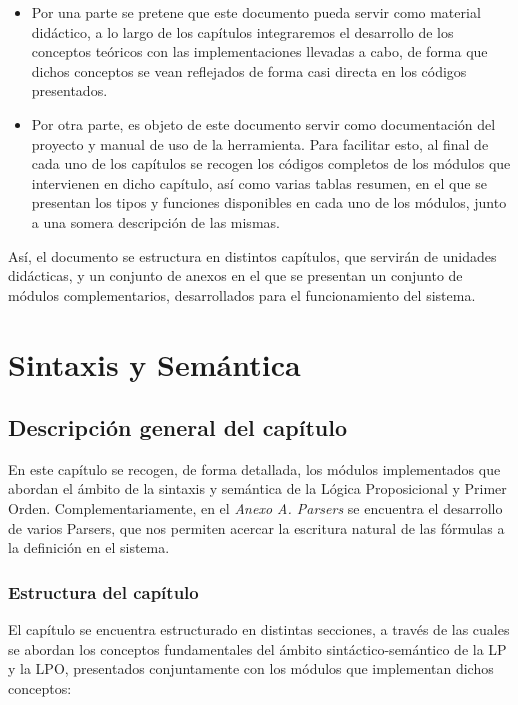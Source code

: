 \documentclass[a4paper]{report}
\begin{document}
\begin{itemize}
\item Por una parte se pretene que este documento pueda servir como material didáctico, a lo largo de los capítulos integraremos el desarrollo de los conceptos teóricos con las implementaciones llevadas a cabo, de forma que dichos conceptos se vean reflejados de forma casi directa en los códigos presentados.

\item Por otra parte, es objeto de este documento servir como documentación del proyecto y  manual de uso de la herramienta. Para facilitar esto, al final de cada uno de los capítulos se recogen los códigos completos de los módulos que intervienen en dicho capítulo, así como varias tablas resumen, en el que se presentan los tipos y funciones disponibles en cada uno de los módulos, junto a una somera descripción de las mismas.

\end{itemize} 

Así, el documento se estructura en distintos capítulos, que servirán de unidades didácticas, y un conjunto de anexos en el que se presentan un conjunto de módulos complementarios, desarrollados para el funcionamiento del sistema.



\chapter{Sintaxis y Semántica}
\renewcommand{\mtctitle}{}
\mtcskip
\minitoc
\newpage

\section{Descripción general del capítulo}

En este capítulo se recogen, de forma detallada, los módulos implementados que abordan el ámbito de la sintaxis y semántica de la Lógica Proposicional y Primer Orden. Complementariamente, en el \textit{Anexo A. Parsers} se encuentra el desarrollo de varios Parsers, que nos permiten acercar la escritura natural de las fórmulas a la definición en el sistema.

\subsection{Estructura del capítulo}

El capítulo se encuentra estructurado en distintas secciones, a través de las cuales se abordan los conceptos fundamentales del ámbito sintáctico-semántico de la LP y la LPO, presentados conjuntamente con los módulos que implementan dichos conceptos:
\end{document}
